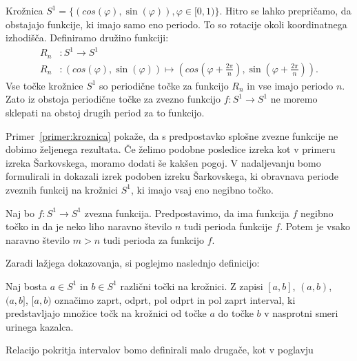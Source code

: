 \documentclass[../TG_magistrsko_delo_sections.tex]{subfiles}
\begin{document}
\begin{primer}\label{primer:kroznica}
Krožnica $S^1 = \{ (cos(\varphi), \sin(\varphi)), \varphi \in [0, 1) \}$. Hitro se lahko prepričamo, da obstajajo funkcije, ki imajo samo eno periodo. To so rotacije okoli koordinatnega izhodišča. Definiramo družino funkciji: 
\begin{equation*} %
\begin{split}
R_n &: S^1 \to S^1 \\ 
R_n &: (cos(\varphi), \sin(\varphi)) \mapsto (cos(\varphi + \frac{2 \pi}{n}), \sin(\varphi + \frac{2 \pi}{n})).
\end{split}
\end{equation*}
Vse točke krožnice $S^1$ so periodične točke za funkcijo $R_n$ in vse imajo periodo $n$. Zato iz obstoja periodične točke za zvezno funkcijo $f : S^1 \to S^1$ ne moremo sklepati na obstoj drugih period za to funkcijo.
\end{primer}

Primer~\ref{primer:kroznica} pokaže, da s predpostavko splošne zvezne funkcije ne dobimo željenega rezultata. Če želimo podobne posledice izreka kot v primeru izreka Šarkovskega, moramo dodati še kakšen pogoj. V nadaljevanju bomo formulirali in dokazali izrek podoben izreku Šarkovskega, ki obravnava periode zveznih funkcij na krožnici $S^1$, ki imajo vsaj eno negibno točko.

\begin{izrek}
Naj bo $f : S^1 \to S^1$ zvezna funkcija. Predpostavimo, da ima funkcija $f$ negibno točko in da je neko liho naravno število $n$ tudi perioda funkcije $f$. Potem je vsako naravno število $m > n$ tudi perioda za funkcijo $f$.
\end{izrek}

Zaradi lažjega dokazovanja, si poglejmo naslednjo definicijo:
\begin{definicija}\label{def:kintervali}
Naj bosta $a \in S^1$ in $b \in S^1$ različni točki na krožnici. Z zapisi $[a, b]$, $(a, b)$, $(a, b]$, $[a, b)$ označimo zaprt, odprt, pol odprt in pol zaprt interval, ki predstavljajo množice točk na krožnici od točke $a$ do točke $b$ v nasprotni smeri urinega kazalca. 
\end{definicija}

Relacijo pokritja intervalov bomo definirali malo drugače, kot v poglavju%
\end{document}
